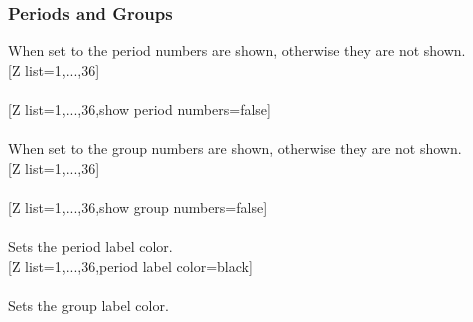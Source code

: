 \subsubsection{\texorpdfstring{ Periods and Groups}{Periods and Groups}}%
\label{option_show period numbers}%
%
{When set to  the period numbers are shown, otherwise they are not shown.}%
\\ [5pt][Z list={1,...,36}]%
\\ [5pt]\makebox[\linewidth][c]{\scalebox{.6}{\pgfPT[Z list={1,...,36}]}}%
\\ [10pt][Z list={1,...,36},show period numbers=false]%
\\ [5pt]\makebox[\linewidth][c]{\scalebox{.6}{\pgfPT[Z list={1,...,36},show period numbers=false]}}%
\\ [5pt]\pgfPTendoption%
\label{option_show group numbers}%
%
{When set to  the group numbers are shown, otherwise they are not shown.}%
\\ [5pt][Z list={1,...,36}]%
\\ [10pt]\makebox[\linewidth][c]{\scalebox{.6}{\pgfPT[Z list={1,...,36}]}}%
\\ [10pt][Z list={1,...,36},show group numbers=false]%
\\ [10pt]\makebox[\linewidth][c]{\scalebox{.6}{\pgfPT[Z list={1,...,36},show group numbers=false]}}%
\\ [5pt]\pgfPTendoption%
\vfill%
\label{option_period label color}%
%
{Sets the period label color.}%
\\ [5pt][Z list={1,...,36},period label color=black]%
\\ [10pt]\makebox[\linewidth][c]{\scalebox{.6}{\pgfPT[Z list={1,...,36},period label color=black]}}%
\\ [5pt]\pgfPTendoption%
\vfill%
\label{option_group label color}%
%
{Sets the group label color.}%
\vfill%
\newpage%
